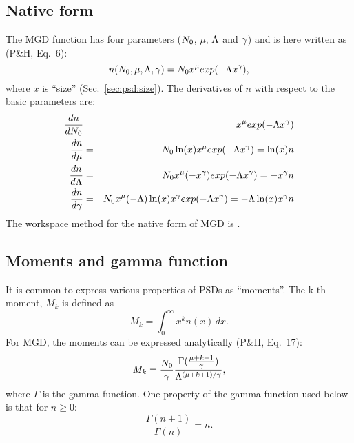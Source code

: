 \subsection{Native form}
\label{sec:mgd_native}
%
The MGD function has four parameters ($N_0$, $\mu$, $\Lambda$ and $\gamma$) and is
here written as (P\&H, Eq.~6):
\begin{equation}
  n(N_0,\mu,\Lambda,\gamma) = N_0 x^\mu exp(-\Lambda x^\gamma),
\end{equation}
where $x$ is ``size'' (Sec.~\ref{sec:psd:size}). The derivatives of $n$ with respect to
the basic parameters are:
\begin{eqnarray}
  \frac{dn}{dN_0} &=& x^\mu exp(-\Lambda x^\gamma) \label{eq:dndno} \\
  \frac{dn}{d\mu} &=& N_0 \ln(x) x^\mu exp(-\Lambda x^\gamma) = \ln(x)n \label{eq:dndmu}\\
  \frac{dn}{d\Lambda} &=& N_0 x^\mu (-x^\gamma) exp(-\Lambda x^\gamma) = -x^\gamma n \label{eq:dndla}\\
  \frac{dn}{d\gamma} &=& N_0 x^\mu (-\Lambda)\ln(x) x^\gamma exp(-\Lambda x^\gamma) =
                      -\Lambda\ln(x) x^\gamma n \label{eq:dndga}
\end{eqnarray}
The workspace method for the native form of MGD is .


\subsection{Moments and gamma function}
%
It is common to express various properties of PSDs as ``moments''. The k-th
moment, $M_k$ is defined as
\begin{equation}
  M_k = \int_0^\infty x^k n(x)\, dx.
\end{equation}
For MGD, the moments can be expressed analytically (P\&H, Eq.~17):
\begin{equation}
  M_k = \frac{N_0}{\gamma}\frac{\Gamma(\frac{\mu+k+1}{\gamma})}{\Lambda^{(\mu+k+1)/\gamma}},
  \label{eq:mdg:mk}
\end{equation}
where $\Gamma$ is the gamma function. One property of the gamma function used
below is that for $n\geq0$:
\begin{equation}
  \frac{\Gamma(n+1)}{\Gamma(n)} = n.
\end{equation}




